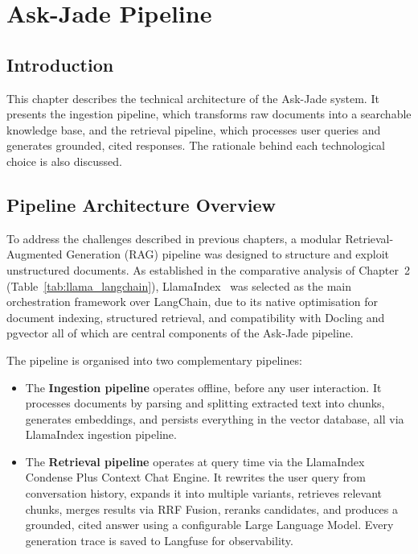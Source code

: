 \chapter{Ask-Jade Pipeline}

\section{Introduction}

This chapter describes the technical architecture of the Ask-Jade system.
It presents the ingestion pipeline, which transforms raw documents into
a searchable knowledge base, and the retrieval pipeline, which processes
user queries and generates grounded, cited responses. The rationale behind
each technological choice is also discussed.

\section{Pipeline Architecture Overview}

To address the challenges described in previous chapters, a modular
Retrieval-Augmented Generation (RAG) pipeline was designed to structure
and exploit unstructured documents. As established in the comparative analysis of Chapter~2
(Table~\ref{tab:llama_langchain}), LlamaIndex~\cite{llamaindex} was selected
as the main orchestration framework over LangChain, due to its native
optimisation for document indexing, structured retrieval, and compatibility
with Docling and pgvector all of which are central components of the
Ask-Jade pipeline.

The pipeline is organised into two complementary pipelines:

\begin{itemize}
  \item The \textbf{Ingestion pipeline} operates offline, before any user
        interaction. It processes documents by parsing and splitting extracted text into  chunks, generates embeddings, and
        persists everything in the vector database, all via LlamaIndex ingestion pipeline.

  \item The \textbf{Retrieval pipeline} operates at query time via the
        LlamaIndex Condense Plus Context Chat Engine. It rewrites
        the user query from conversation history, expands it into multiple
        variants, retrieves relevant chunks, merges results via RRF Fusion,
        reranks candidates, and produces a grounded, cited answer using a configurable Large Language Model. Every generation trace is saved to
        Langfuse for observability.
\end{itemize}



